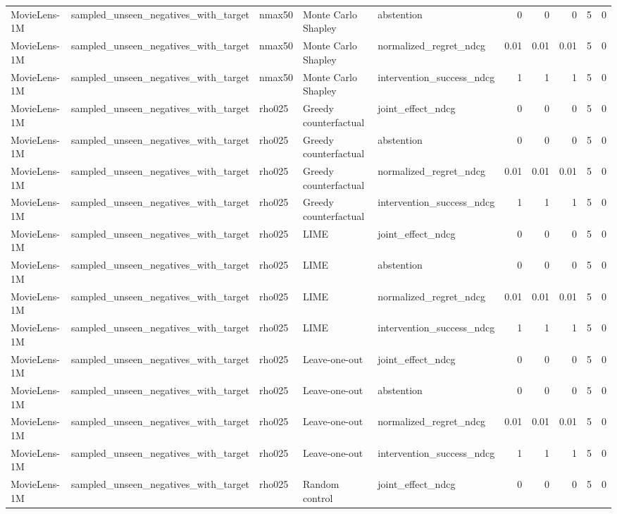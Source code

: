\begin{table}[t]
{\begin{tabular}{lllllrrrrr}
MovieLens-1M & sampled\_unseen\_negatives\_with\_target & nmax50 & Monte Carlo Shapley & abstention & 0 & 0 & 0 & 5 & 0 \\
MovieLens-1M & sampled\_unseen\_negatives\_with\_target & nmax50 & Monte Carlo Shapley & normalized\_regret\_ndcg & 0.01 & 0.01 & 0.01 & 5 & 0 \\
MovieLens-1M & sampled\_unseen\_negatives\_with\_target & nmax50 & Monte Carlo Shapley & intervention\_success\_ndcg & 1 & 1 & 1 & 5 & 0 \\
MovieLens-1M & sampled\_unseen\_negatives\_with\_target & rho025 & Greedy counterfactual & joint\_effect\_ndcg & 0 & 0 & 0 & 5 & 0 \\
MovieLens-1M & sampled\_unseen\_negatives\_with\_target & rho025 & Greedy counterfactual & abstention & 0 & 0 & 0 & 5 & 0 \\
MovieLens-1M & sampled\_unseen\_negatives\_with\_target & rho025 & Greedy counterfactual & normalized\_regret\_ndcg & 0.01 & 0.01 & 0.01 & 5 & 0 \\
MovieLens-1M & sampled\_unseen\_negatives\_with\_target & rho025 & Greedy counterfactual & intervention\_success\_ndcg & 1 & 1 & 1 & 5 & 0 \\
MovieLens-1M & sampled\_unseen\_negatives\_with\_target & rho025 & LIME & joint\_effect\_ndcg & 0 & 0 & 0 & 5 & 0 \\
MovieLens-1M & sampled\_unseen\_negatives\_with\_target & rho025 & LIME & abstention & 0 & 0 & 0 & 5 & 0 \\
MovieLens-1M & sampled\_unseen\_negatives\_with\_target & rho025 & LIME & normalized\_regret\_ndcg & 0.01 & 0.01 & 0.01 & 5 & 0 \\
MovieLens-1M & sampled\_unseen\_negatives\_with\_target & rho025 & LIME & intervention\_success\_ndcg & 1 & 1 & 1 & 5 & 0 \\
MovieLens-1M & sampled\_unseen\_negatives\_with\_target & rho025 & Leave-one-out & joint\_effect\_ndcg & 0 & 0 & 0 & 5 & 0 \\
MovieLens-1M & sampled\_unseen\_negatives\_with\_target & rho025 & Leave-one-out & abstention & 0 & 0 & 0 & 5 & 0 \\
MovieLens-1M & sampled\_unseen\_negatives\_with\_target & rho025 & Leave-one-out & normalized\_regret\_ndcg & 0.01 & 0.01 & 0.01 & 5 & 0 \\
MovieLens-1M & sampled\_unseen\_negatives\_with\_target & rho025 & Leave-one-out & intervention\_success\_ndcg & 1 & 1 & 1 & 5 & 0 \\
MovieLens-1M & sampled\_unseen\_negatives\_with\_target & rho025 & Random control & joint\_effect\_ndcg & 0 & 0 & 0 & 5 & 0 \\

\end{tabular}}
\end{table}
